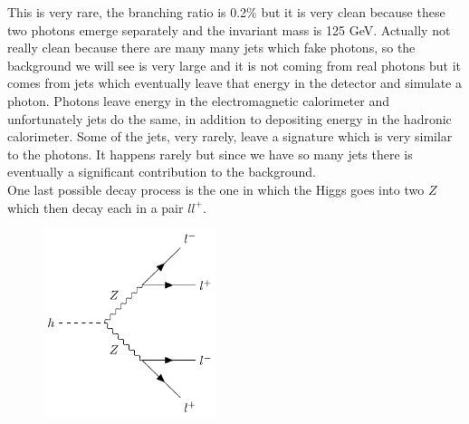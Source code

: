 \documentclass[../main.tex]{subfiles}
\begin{document}
This is very rare, the branching ratio is 0.2\% but it is very clean because these two photons emerge separately and the invariant mass is 125 GeV. Actually not really clean because there are many many jets which fake photons, so the background we will see is very large and it is not coming from real photons but it comes from jets which eventually leave that energy in the detector and simulate a photon. Photons leave energy in the electromagnetic calorimeter and unfortunately jets do the same, in addition to depositing energy in the hadronic calorimeter. Some of the jets, very rarely, leave a signature which is very similar to the photons. It happens rarely but since we have so many jets there is eventually a significant contribution to the background.\\
One last possible decay process is the one in which the Higgs goes into two $Z$ which then decay each in a pair $ll^+$.
\begin{figure}[h]
    \centering
    \includegraphics[width=0.45\textwidth]{Images/h4l.pdf}
    \caption*{}
\end{figure}\\
\end{document}
